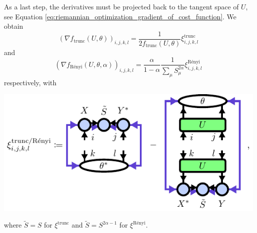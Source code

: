 As a last step, the derivatives must be projected back to the tangent space of $U$, see Equation \eqref{eq:riemannian_optimization_gradient_of_cost_function}. We obtain
\begin{equation}
	\left(\nabla f_\text{trunc}\left(U,\theta\right)\right)_{i,j,k,l} = \frac{1}{2f_\text{trunc}\left(U,\theta\right)}\xi^\text{trunc}_{i,j,k,l}
\end{equation}
and
\begin{equation}
	\left(\nabla f_\text{Rényi}\left(U,\theta,\alpha\right)\right)_{i,j,k,l} = \frac{\alpha}{1-\alpha}\frac{1}{\sum_\mu S_\mu^{2\alpha}}\xi^\text{Rényi}_{i,j,k,l}
\end{equation}
respectively, with
\begin{center}
	\includegraphics[scale=1]{figures/tikz/gradient_and_hvp/xi_definition/xi_definition.pdf}
\end{center}
where $\tilde{S} = S$ for $\xi^\text{trunc}$ and $\tilde{S} = S^{2\alpha-1}$ for $\xi^\text{Rényi}$.
%
%
